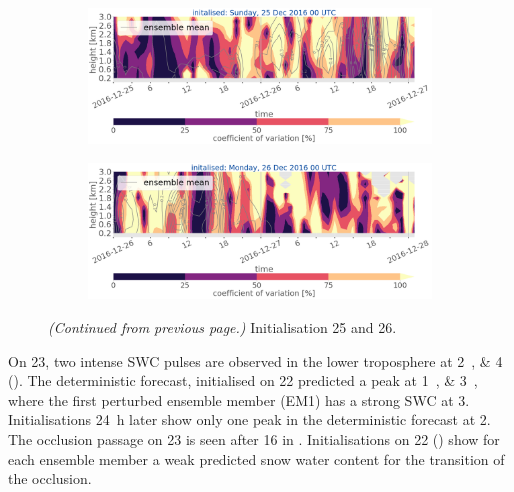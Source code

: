 \begin{figure}[t!]\ContinuedFloat
	\begin{subfigure}[b]{\textwidth}
		\includegraphics[trim={0cm 5cm 0cm 0cm},clip,width=\textwidth]{./fig_variation/20161225}
		\caption{}\label{fig:vari:EM25}
	\end{subfigure}
	\begin{subfigure}[b]{\textwidth}
		\includegraphics[trim={0cm 0cm 0cm 0cm},clip,width=\textwidth]{./fig_variation/20161226}
		\caption{}\label{fig:vari:EM26}
	\end{subfigure}
	\caption{\textit{(Continued from previous page.)} Initialisation \num{25} and \SI{26}{\dec}.}
\end{figure}
\noindent 
On \SI{23}{\dec}, two intense SWC pulses are observed in the lower troposphere at \SIlist{2;4}{\UTC} (). The deterministic forecast, initialised on \SI{22}{\dec} predicted a peak at \SIlist{1;3}{\UTC}, where the first perturbed ensemble member (EM1) has a strong SWC at \SI{3}{\UTC}. Initialisations \SI{24}{\hour} later show only one peak in the deterministic forecast at \SI{2}{\UTC}.
\\
The occlusion passage on \SI{23}{\dec} is seen after \SI{16}{\UTC} in .  
% 
Initialisations on \SI{22}{\dec} () show for each ensemble member a weak predicted snow water content for the transition of the occlusion. 
